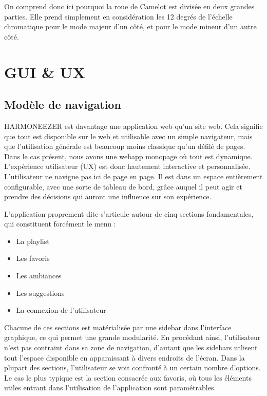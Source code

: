 \documentclass[a4paper,12pt]{article}
\begin{document}
On comprend donc ici pourquoi la roue de Camelot est divisée en deux grandes parties. Elle prend simplement en considération les 12 degrés de l'échelle chromatique pour le mode majeur d'un côté, et pour le mode mineur d'un autre côté.

\newpage

\section{GUI \& UX}

\subsection{Modèle de navigation}

HARMONEEZER est davantage une application web qu'un site web. Cela signifie que tout est disponible sur le web et utilisable avec un simple navigateur, mais que l'utilisation générale est beaucoup moins classique qu'un défilé de pages. Dans le cas présent, nous avons une webapp monopage où tout est dynamique. L'expérience utilisateur (UX) est donc hautement interactive et personnalisée. L'utilisateur ne navigue pas ici de page en page. Il est dans un espace entièrement configurable, avec une sorte de tableau de bord, grâce auquel il peut agir et prendre des décisions qui auront une influence sur son expérience.

L'application proprement dite s'articule autour de cinq sections fondamentales, qui constituent forcément le menu :

\begin{itemize}
 \item{La playlist}
 \item{Les favoris}
 \item{Les ambiances}
 \item{Les suggestions}
 \item{La connexion de l'utilisateur}
\end{itemize}

Chacune de ces sections est matérialisée par une sidebar dans l'interface graphique, ce qui permet une grande modularité. En procédant ainsi, l'utilisateur n'est pas contraint dans sa zone de navigation, d'autant que les sidebars utlisent tout l'espace disponible en apparaissant à divers endroits de l'écran. Dans la plupart des sections, l'utilisateur se voit confronté à un certain nombre d'options. Le cas le plus typique est la section consacrée aux favoris, où tous les éléments utiles entrant dans l'utilisation de l'application sont paramétrables.
\end{document}
